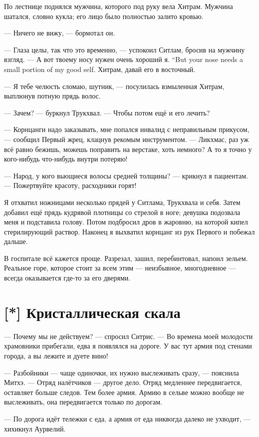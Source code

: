 По лестнице поднялся мужчина, которого под руку вела Хитрам.
Мужчина шатался, словно кукла;
его лицо было полностью залито кровью.

--- Ничего не вижу, --- бормотал он.

--- Глаза целы, так что это временно, --- успокоил Ситлам, бросив на мужчину взгляд.
{--- А вот твоему носу нужен очень хороший я.}
{``But your nose needs a small portion of my good self.}
Хитрам, давай его в восточный.

--- Я тебе челюсть сломаю, шутник, --- посулилась взмыленная Хитрам, выплюнув потную прядь волос.

--- Зачем? --- буркнул Трукхвал.
--- Чтобы потом ещё и его лечить?

--- Корнцанги надо заказывать, мне попался инвалид с неправильным прикусом, --- сообщил Первый жрец, клацнув рекомым инструментом.
--- Ликхмас, раз уж всё равно бежишь, можешь поправить на верстаке, хоть немного?
А то я точно у кого-нибудь что-нибудь внутри потеряю!

--- Народ, у кого вьющиеся волосы средней толщины? --- крикнул я пациентам.
--- Пожертвуйте красоту, расходники горят!

Я отхватил ножницами несколько прядей у Ситлама, Трукхвала и себя.
Затем добавил ещё прядь кудрявой плотницы со стрелой в ноге;
девушка подозвала меня и подставила голову.
Потом подбросил дров в жаровню, на которой кипел стерилирующий раствор.
Наконец я выхватил корнцанг из рук Первого и побежал дальше.

В госпитале всё кажется проще.
Разрезал, зашил, перебинтовал, напоил зельем.
Реальное горе, которое стоит за всем этим --- неизбывное, многодневное --- всегда оказывается где-то за его дверями.

\section{[*] Кристаллическая скала}

--- Почему мы не действуем? --- спросил Ситрис.
--- Во времена моей молодости храмовники прибегали, едва я появлялся на дороге.
У вас тут армия под стенами города, а вы лежите и дуете вино!

--- Разбойники --- чаще одиночки, их нужно выслеживать сразу, --- пояснила Митхэ.
--- Отряд налётчиков --- другое дело.
Отряд медленнее передвигается, оставляет больше следов.
Тем более армия.
Армию в сельве можно вообще не выслеживать, она передвигается только по дорогам.

--- По дорога идёт тележки с еда, а армия от еда никвогда далеко не ухводит, --- хихикнул Аурвелий.

